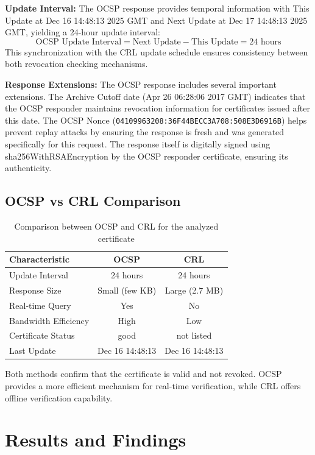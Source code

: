 \documentclass[12pt,a4paper]{article}
\begin{document}
\textbf{Update Interval:} The OCSP response provides temporal information with This Update at Dec 16 14:48:13 2025 GMT and Next Update at Dec 17 14:48:13 2025 GMT, yielding a 24-hour update interval:
\[
\text{OCSP Update Interval} = \text{Next Update} - \text{This Update} = 24 \text{ hours}
\]
This synchronization with the CRL update schedule ensures consistency between both revocation checking mechanisms.

\textbf{Response Extensions:} The OCSP response includes several important extensions. The Archive Cutoff date (Apr 26 06:28:06 2017 GMT) indicates that the OCSP responder maintains revocation information for certificates issued after this date. The OCSP Nonce (\texttt{04109963208:\allowbreak 36F44BECC3A708:\allowbreak 508E3D6916B}) helps prevent replay attacks by ensuring the response is fresh and was generated specifically for this request. The response itself is digitally signed using sha256WithRSAEncryption by the OCSP responder certificate, ensuring its authenticity.

\subsection{OCSP vs CRL Comparison}

\begin{table}[H]
\centering
\begin{tabular}{lcc}
\toprule
\textbf{Characteristic} & \textbf{OCSP} & \textbf{CRL} \\
\midrule
Update Interval & 24 hours & 24 hours \\
Response Size & Small (few KB) & Large (2.7 MB) \\
Real-time Query & Yes & No \\
Bandwidth Efficiency & High & Low \\
Certificate Status & good & not listed \\
Last Update & Dec 16 14:48:13 & Dec 16 14:48:13 \\
\bottomrule
\end{tabular}
\caption{Comparison between OCSP and CRL for the analyzed certificate}
\end{table}

Both methods confirm that the certificate is valid and not revoked. OCSP provides a more efficient mechanism for real-time verification, while CRL offers offline verification capability.

\section{Results and Findings}
\end{document}
